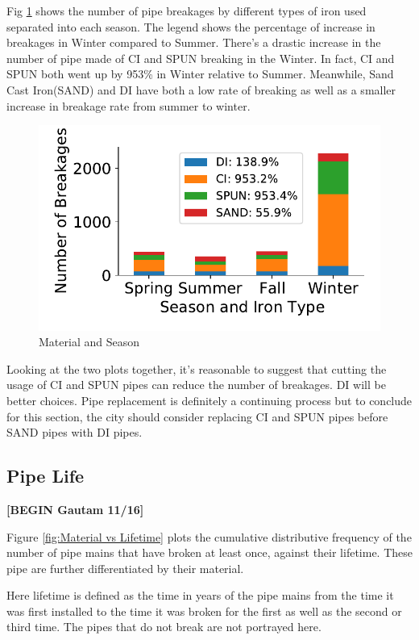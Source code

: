\documentclass[twocolumn]{article}
\begin{document}
Fig \ref{fig:Material and Season} shows the number of pipe breakages by different types of iron used separated into each season. The legend shows the percentage of increase in breakages in Winter compared to Summer. There's a drastic increase in the number of pipe made of CI and SPUN breaking in the Winter. In fact, CI and SPUN both went up by 953\% in Winter relative to Summer. Meanwhile, Sand Cast Iron(SAND) and DI have both a low rate of breaking as well as a smaller increase in breakage rate from summer to winter. 
\begin{figure}[H]
    \includegraphics[width=\columnwidth]{Wen/Season and Iron Type.pdf}
    \caption{Material and Season}
    \label{fig:Material and Season}
\end{figure}
Looking at the two plots together,  it's reasonable to suggest that cutting the usage of CI and SPUN pipes can reduce the number of breakages. DI will be better choices. Pipe replacement is definitely a continuing process but to conclude for this section, the city should consider replacing CI and SPUN pipes before SAND pipes with DI pipes. 





\subsection{Pipe Life}

\textbf{[BEGIN Gautam 11/16]}

Figure \ref{fig:Material vs Lifetime} plots the cumulative distributive frequency of the number of pipe mains that have broken at least once, against their lifetime. These pipe are further differentiated by their material.

Here lifetime is defined as the time in years of the pipe mains from the time it was first installed to the time it was broken for the first as well as the second or third time. The pipes that do not break are not portrayed here.
\end{document}
